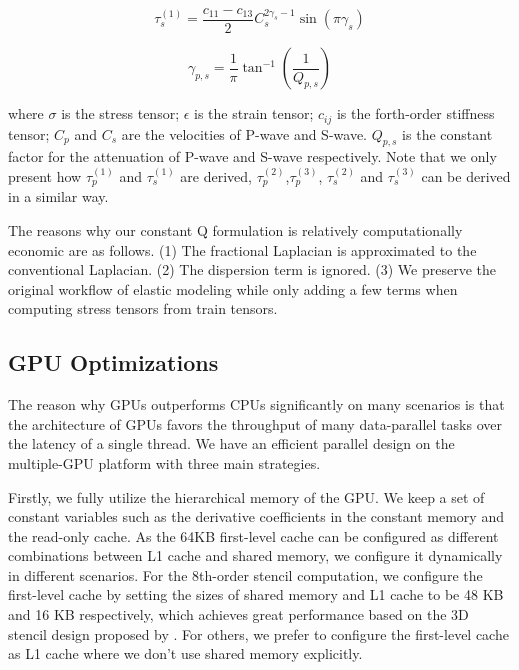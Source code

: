 \documentclass{paris17}
\begin{document}
\begin{equation}
  \tau_s^{(1)} = \frac{c_{11} - c_{13}}{2}C_s^{2\gamma_s - 1}\sin(\pi \gamma_s)
\end{equation}

\begin{equation}
  \gamma_{p,s}=\frac{1}{\pi}\tan^{-1}(\frac{1}{Q_{p,s}})
\end{equation}

where $\sigma$ is the stress tensor; $\epsilon$ is the strain tensor; $c_{ij}$ is the forth-order stiffness tensor; $C_p$ and $C_s$ are the velocities of P-wave and S-wave. $Q_{p,s}$ is the constant factor for the attenuation of P-wave and S-wave respectively. Note that we only present how $\tau_p^{(1)}$ and $\tau_s^{(1)}$ are derived, $\tau_p^{(2)}$,$\tau_p^{(3)}$, $\tau_s^{(2)}$ and $\tau_s^{(3)}$ can be derived in a similar way.

The reasons why our constant Q formulation is relatively computationally economic are as follows. (1) The fractional Laplacian is approximated to the conventional Laplacian. (2) The dispersion term is ignored. (3) We preserve the original workflow of elastic modeling while only adding a few terms when computing stress tensors from train tensors.

\subsection{GPU Optimizations}

The reason why GPUs outperforms CPUs significantly on many scenarios is that the architecture of GPUs favors the throughput of many data-parallel tasks over the latency of a single thread. We have an efficient parallel design on the multiple-GPU platform with three main strategies.

Firstly, we fully utilize the hierarchical memory of the GPU. We keep a set of constant variables such as the derivative coefficients in the constant memory and the read-only cache. As the 64KB first-level cache can be configured as different combinations between L1 cache and shared memory, we configure it dynamically in different scenarios. For the 8th-order stencil computation, we configure the first-level cache by setting the sizes of shared memory and L1 cache to be 48 KB and 16 KB respectively, which achieves great performance based on the 3D stencil design proposed by \cite{micikevicius20093d}. For others, we prefer to configure the first-level cache as L1 cache where we don't use shared memory explicitly.
\end{document}
